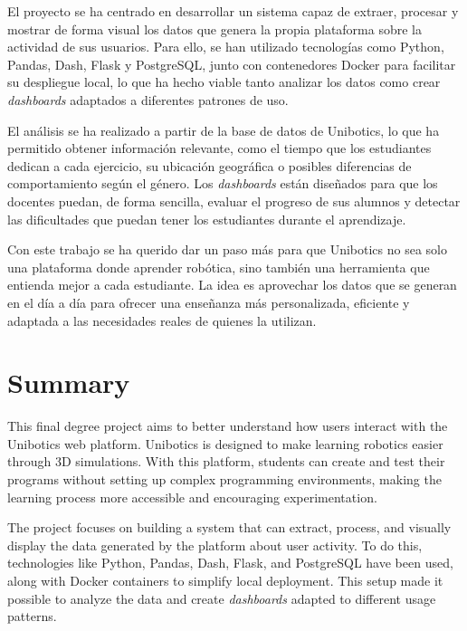 \documentclass[a4paper, 12pt]{book}
\begin{document}
El proyecto se ha centrado en desarrollar un sistema capaz de extraer, procesar y mostrar de forma visual los datos que genera la propia plataforma sobre la actividad de sus usuarios. Para ello, se han utilizado tecnologías como Python, Pandas, Dash, Flask y PostgreSQL, junto con contenedores Docker para facilitar su despliegue local, lo que ha hecho viable tanto analizar los datos como crear \textit{dashboards}  adaptados a diferentes patrones de uso.

El análisis se ha realizado a partir de la base de datos de Unibotics, lo que ha permitido obtener información relevante, como el tiempo que los estudiantes dedican a cada ejercicio, su ubicación geográfica o posibles diferencias de comportamiento según el género. Los \textit{dashboards}  están diseñados para que los docentes puedan, de forma sencilla, evaluar el progreso de sus alumnos y detectar las dificultades que puedan tener los estudiantes durante el aprendizaje.

Con este trabajo se ha querido dar un paso más para que Unibotics no sea solo una plataforma donde aprender robótica, sino también una herramienta que entienda mejor a cada estudiante. La idea es aprovechar los datos que se generan en el día a día para ofrecer una enseñanza más personalizada, eficiente y adaptada a las necesidades reales de quienes la utilizan.


\chapter*{Summary}

This final degree project aims to better understand how users interact with the Unibotics web platform. Unibotics is designed to make learning robotics easier through 3D simulations. With this platform, students can create and test their programs without setting up complex programming environments, making the learning process more accessible and encouraging experimentation.

The project focuses on building a system that can extract, process, and visually display the data generated by the platform about user activity. To do this, technologies like Python, Pandas, Dash, Flask, and PostgreSQL have been used, along with Docker containers to simplify local deployment. This setup made it possible to analyze the data and create \textit{dashboards}  adapted to different usage patterns.
\end{document}
